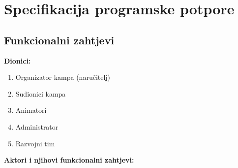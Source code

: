 \chapter{Specifikacija programske potpore}

\section{Funkcionalni zahtjevi}

\noindent \textbf{Dionici:} 
\begin{enumerate}
	\item Organizator kampa (naručitelj)
	\item Sudionici kampa
	\item Animatori
	\item Administrator
	\item Razvojni tim\\
\end{enumerate}

\noindent \textbf{Aktori i njihovi funkcionalni zahtjevi: } 

